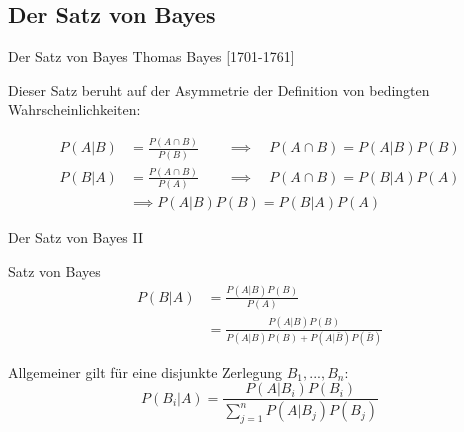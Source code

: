 \documentclass[
  10pt,
  ignorenonframetext,
]{beamer}
\begin{document}
\hypertarget{der-satz-von-bayes}{%
\subsection{Der Satz von Bayes}\label{der-satz-von-bayes}}

\begin{frame}{Der Satz von Bayes}
\protect\hypertarget{der-satz-von-bayes-1}{}
Thomas Bayes {[}1701-1761{]}

Dieser Satz beruht auf der Asymmetrie der Definition von bedingten
Wahrscheinlichkeiten:

\begin{align*}
P(A|B) & = \frac{P(A \cap B)}{P(B)} \qquad \implies \quad
P(A \cap B) = P(A|B)P(B)\\
P(B|A) & =  \frac{P(A \cap B)}{P(A)} \qquad \implies \quad
P(A \cap B) = P(B|A)P(A)\\
& \implies P(A|B)P(B) = P(B|A)P(A)
\end{align*}
\end{frame}

\begin{frame}{Der Satz von Bayes II}
\protect\hypertarget{der-satz-von-bayes-ii}{}
\begin{block}{Satz von Bayes}
\protect\hypertarget{satz-von-bayes}{}
\begin{align*}
P(B|A)&= \frac{P(A|B)P(B)}{P(A)} \\
      &= \frac{P(A|B)P(B)}{P(A|B)P(B) + P(A|\bar{B})P(\bar{B})}
\end{align*}
\end{block}

Allgemeiner gilt für eine disjunkte Zerlegung \(B_1, ..., B_n\):\\
\[P(B_i|A) = \frac{P(A|B_i)P(B_i)}{\sum_{j=1}^n P(A|B_j)P(B_j)}\]
\end{frame}
\end{document}
